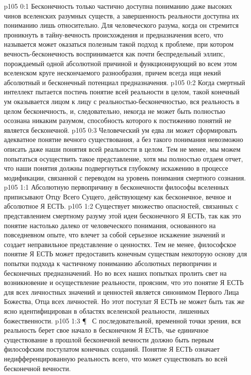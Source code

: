 \vs p105 0:1 Бесконечность только частично доступна пониманию даже высоких чинов вселенских разумных существ, а завершенность реальности доступна их пониманию лишь относительно. Для человеческого разума, когда он стремится проникнуть в тайну\hyp{}вечность происхождения и предназначения всего, что называется  может оказаться полезным такой подход к проблеме, при котором вечность\hyp{}бесконечность воспринимается как почти беспредельный эллипс, порождаемый одной абсолютной причиной и функционирующий во всем этом вселенском круге нескончаемого разнообразия, причем всегда ищя некий абсолютный и бесконечный потенциал предназначения.
\vs p105 0:2 Когда смертный интеллект пытается постичь понятие всей реальности в целом, такой конечный ум оказывается лицом к лицу с реальностью\hyp{}бесконечностью, вся реальность в целом  бесконечность, и, следовательно, некогда не может быть полностью осознана никаким разумом, способность которого к постижению понятий не является бесконечной.
\vs p105 0:3 Человеческий ум едва ли может сформировать адекватное понятие вечного существования, а без такого понимания невозможно описать даже наши понятия всей реальности в целом. Тем не менее, мы можем попытаться осуществить такое представление, хотя мы полностью отдаем отчет, что наши понятия должны подвергнуться глубокому искажению в процессе модификации, связанной с переводом на уровень понимания смертного сознания.
\vs p105 1:1 Абсолютную первопричину в бесконечности философы вселенных приписывают Отцу Всего Сущего, действующему как бесконечное, вечное и абсолютное Я ЕСТЬ.
\vs p105 1:2 Существует множество опасностей, связанных с представлением смертному разуму этой идеи бесконечного Я ЕСТЬ, так как это понятие настолько далеко от человеческого понимания, основанного на повседневном опыте, что влечет за собой серьезное искажение значений и создает неправильное представление о ценностях. Тем не менее, философское понятие Я ЕСТЬ может предоставить конечным существам некоторую основу для попытки подхода к частичному пониманию абсолютных первопричин и бесконечных предназначений. Но во всех наших попытках пролить свет на возникновение и осуществление реальности, проясним, что это понятие Я ЕСТЬ для всех личностных значений и ценностей является синонимом Первого Лица Божества, Отца всех личностей. Но этот постулат Я ЕСТЬ не может быть так же ясно идентифицирован в областях вселенской реальности, лишенных божественности.
\vs p105 1:3 \P\  С последовательной, временной точки зрения, вся реальность берет свое начало в бесконечном Я ЕСТЬ, чье единичное существование в прошлой бесконечной вечности должно быть первым философским постулатом конечных созданий. Понятие Я ЕСТЬ означает  недифференцированную реальность всего, что может существовать во всей бесконечной вечности.
